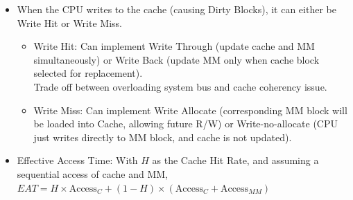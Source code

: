 \documentclass[10pt]{article}
\begin{document}
\begin{itemize}
    Some policies are Least Recently Used algorithm and FIFO approach.
    \item When the CPU writes to the cache (causing Dirty Blocks), it can either be Write Hit or Write Miss.
    \begin{itemize}
        \item Write Hit: Can implement Write Through (update cache and MM simultaneously) or Write Back (update MM only when cache block selected for replacement).\\
        Trade off between overloading system bus and cache coherency issue.
        \item Write Miss: Can implement Write Allocate (corresponding MM block will be loaded into Cache, allowing future R/W) or Write-no-allocate (CPU just writes directly to MM block, and cache is not updated).
    \end{itemize}
    \item Effective Access Time: With $H$ as the Cache Hit Rate, and assuming a sequential access of cache and MM,
    $EAT = H \times \text{Access}_C + (1-H) \times (\text{Access}_C + \text{Access}_{MM})$
\end{itemize}
\end{document}
